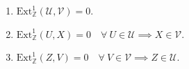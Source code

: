 \documentclass[preview]{standalone}
\begin{document}
\begin{center}
\begin{enumerate} \item $\text{Ext}^1_\mathbb{Z} (\mathcal{U}, \mathcal{V}) = 0$.\item $\text{Ext}^1_\mathbb{Z} (U, X) = 0 \quad \forall \ U\in\mathcal{U} \implies X\in\mathcal{V}$.\item $\text{Ext}^1_\mathbb{Z} (Z, V) = 0 \quad \forall \ V\in\mathcal{V} \implies Z\in\mathcal{U}$. \end{enumerate}
\end{center}
\end{document}

